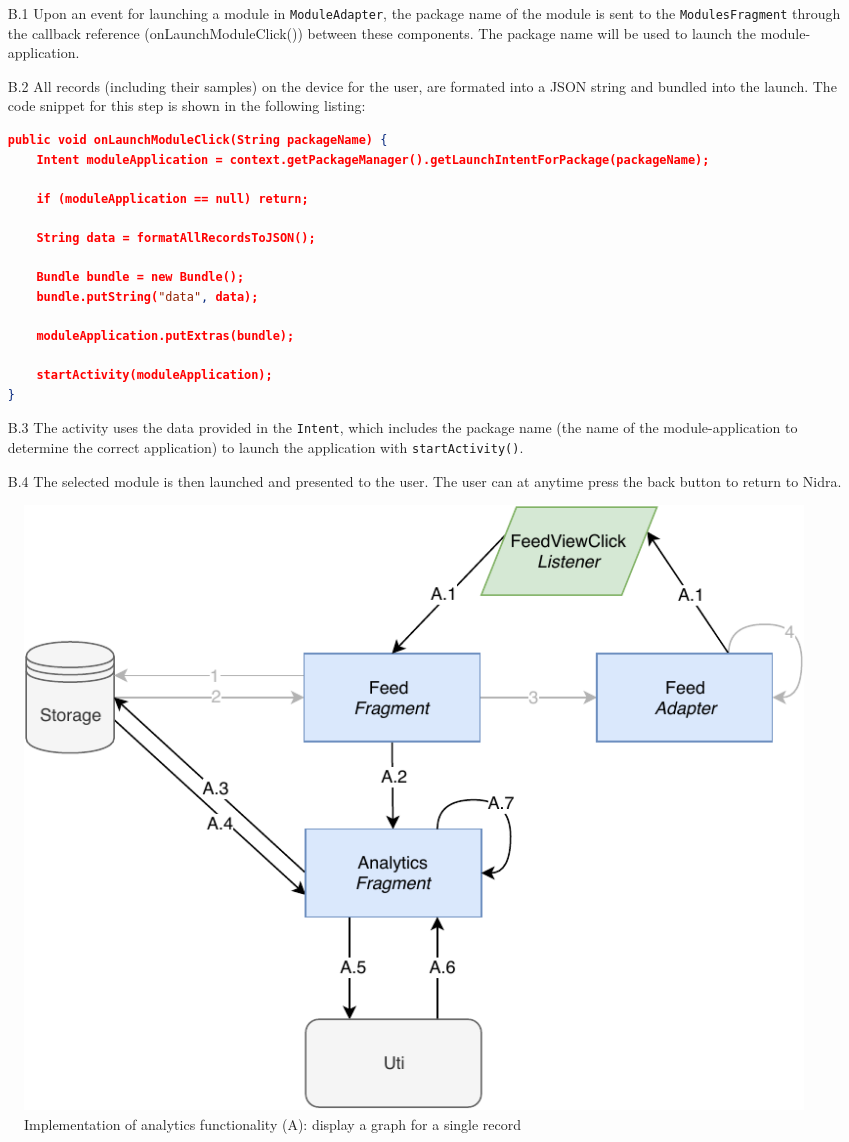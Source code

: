 \begin{itemize}
    \item[B.1] Upon an event for launching a module in \verb|ModuleAdapter|, the package name of the module is sent to the \verb|ModulesFragment| through the callback reference (onLaunchModuleClick()) between these components. The package name will be used to launch the module-application.
    \item[B.2] All records (including their samples) on the device for the user, are formated into a JSON string and bundled into the launch. The code snippet for this step is shown in the following listing:
\begin{lstlisting}[language=json, caption={}, captionpos=b]
public void onLaunchModuleClick(String packageName) {
    Intent moduleApplication = context.getPackageManager().getLaunchIntentForPackage(packageName);

    if (moduleApplication == null) return;

    String data = formatAllRecordsToJSON();

    Bundle bundle = new Bundle();
    bundle.putString("data", data);

    moduleApplication.putExtras(bundle);

    startActivity(moduleApplication);
}
\end{lstlisting}

    \item[B.3] The activity uses the data provided in the \verb|Intent|, which includes the package name (the name of the module-application to determine the correct application) to launch the application with \verb|startActivity()|.
    \item[B.4] The selected module is then launched and presented to the user. The user can at anytime press the back button to return to Nidra.  
\end{itemize}

\begin{figure}
    \centering
    \includegraphics[scale=0.7]{images/Anal_Imp.pdf}
    \caption{Implementation of analytics functionality (A): display a graph for a single record}
    \label{fig:impl_analytics}
\end{figure}

